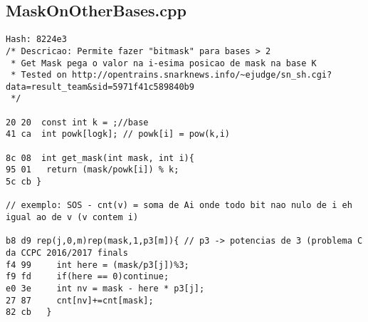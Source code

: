 \documentclass[11pt, a4paper, twoside]{article}
\begin{document}
\subsection{MaskOnOtherBases.cpp}
\begin{lstlisting}
Hash: 8224e3
/* Descricao: Permite fazer "bitmask" para bases > 2
 * Get Mask pega o valor na i-esima posicao de mask na base K
 * Tested on http://opentrains.snarknews.info/~ejudge/sn_sh.cgi?data=result_team&sid=5971f41c589840b9
 */
 
20 20  const int k = ;//base
41 ca  int powk[logk]; // powk[i] = pow(k,i) 

8c 08  int get_mask(int mask, int i){
95 01 	return (mask/powk[i]) % k;
5c cb }

// exemplo: SOS - cnt(v) = soma de Ai onde todo bit nao nulo de i eh igual ao de v (v contem i)

b8 d9 rep(j,0,m)rep(mask,1,p3[m]){ // p3 -> potencias de 3 (problema C da CCPC 2016/2017 finals
f4 99     int here = (mask/p3[j])%3;
f9 fd     if(here == 0)continue;
e0 3e     int nv = mask - here * p3[j];
27 87     cnt[nv]+=cnt[mask];
82 cb   }
\end{lstlisting}
\end{document}
